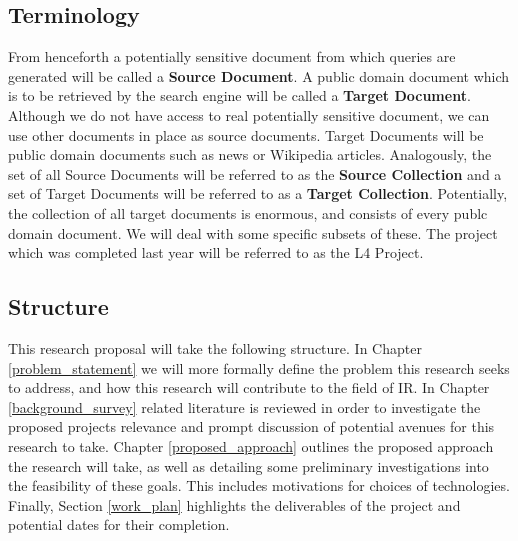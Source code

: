 \documentclass{mprop}
\begin{document}
\subsection{Terminology}
From henceforth a potentially sensitive document from which queries are generated will be called a \textbf{Source Document}. 
A public domain document which is to be retrieved by the search engine will be called a \textbf{Target Document}.
Although we do not have access to real potentially sensitive document, we can use other documents in place as source documents.
Target Documents will be public domain documents such as news or Wikipedia articles.
Analogously, the set of all Source Documents will be referred to as the \textbf{Source Collection} and a set of Target Documents will be referred to as a \textbf{Target Collection}.
Potentially, the collection of all target documents is enormous, and consists of every publc domain document. We will deal with some specific subsets of these.
The project which was completed last year will be referred to as the L4 Project.

\subsection{Structure}
This research proposal will take the following structure. 
In Chapter \ref{problem_statement} we will more formally define the problem this research seeks to address, and how this research will contribute to the field of IR. 
In Chapter \ref{background_survey} related literature is reviewed in order to investigate the proposed projects relevance and prompt discussion of potential avenues for this research to take. 
Chapter \ref{proposed_approach} outlines the proposed approach the research will take, as well as detailing some preliminary investigations into the feasibility of these goals. 
This includes motivations for choices of technologies. Finally, Section \ref{work_plan} highlights the deliverables of the project and potential dates for their completion.

\end{document}
